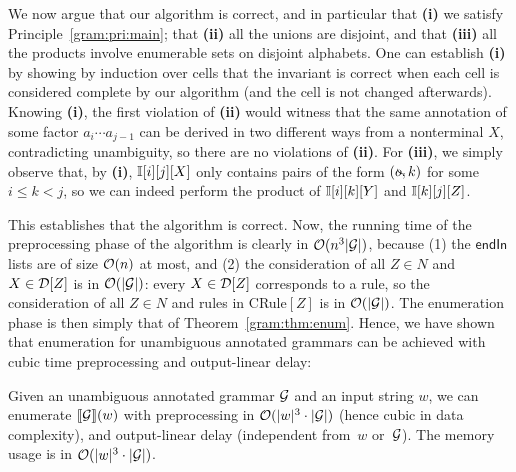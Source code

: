 We now argue that our algorithm is correct, and in particular
that 
\textbf{(i)} 
%
we satisfy Principle~\ref{gram:pri:main};
that
\textbf{(ii)} all the unions are disjoint, and that \textbf{(iii)} all the
products involve enumerable sets on disjoint alphabets. 
One can establish \textbf{(i)} by showing by induction over cells that the invariant is
correct when each cell is considered complete by our algorithm (and the
cell is not changed afterwards). Knowing \textbf{(i)}, the first violation of \textbf{(ii)} would witness that
the same annotation of some factor $a_i \cdots a_{j-1}$ can be derived in two
different ways from a nonterminal $X$,
contradicting unambiguity, so there are no
violations of \textbf{(ii)}. For
\textbf{(iii)}, we simply observe that, by \textbf{(i)}, $\mathbb{I}[i][j][X]$
only contains pairs of the form $(\oout, k)$ for some $i \leq k < j$, so we can
indeed perform the product of $\mathbb{I}[i][k][Y]$ and $\mathbb{I}[k][j][Z]$.

This establishes that the algorithm is correct. Now, the running time
of the preprocessing phase of the algorithm is clearly in $\mathcal{O}(n^3 |\mathcal{G}|)$, because (1) the $\mathsf{endIn}$ lists
are of size $\mathcal{O}(n)$ at most, and (2) the consideration of all $Z \in N$ and $X \in \mathcal{D}[Z]$
is in $\mathcal{O}(|\mathcal{G}|)$: every $X \in \mathcal{D}[Z]$ corresponds to a rule, so the consideration of all $Z \in N$ and
rules in CRule$[Z]$ is in $\mathcal{O}(|\mathcal{G}|)$.
%
The enumeration phase is then simply that of Theorem~\ref{gram:thm:enum}. Hence, we have
shown that enumeration for unambiguous annotated grammars can be achieved
with cubic time preprocessing and output-linear delay:

\begin{theorem}
  \label{gram:thm:cubic}
	Given an unambiguous annotated grammar $\mathcal{G}$ and an input string
        $w$, we can enumerate ${\llbracket{\mathcal{G}}\rrbracket}(w)$ with preprocessing in $\mathcal{O}(|w|^3
        \cdot
        |\mathcal{G}|)$ (hence cubic in data complexity), and output-linear delay
        (independent from~$w$ or~$\mathcal{G}$). The memory usage is in $\mathcal{O}(|w|^3 \cdot
        |\mathcal{G}|)$.
\end{theorem}	



\newcommand{\To}{\textbf{to}}
\newcommand{\Downto}{\textbf{downto}}

